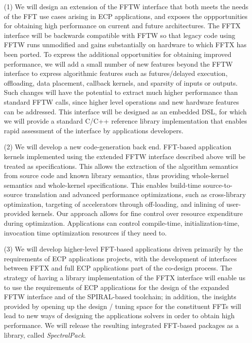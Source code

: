 \begin{trivlist}
\item
(1) We will design an extension of the FFTW interface that both meets the needs of the FFT use cases arising in ECP applications, and exposes the
oppportunities for obtaining high performance on current and future 
architectures. The FFTX interface will be 
backwards compatible with FFTW so that legacy code using FFTW runs unmodified and gains substantially on hardware to which FFTX has been ported.
To express the additional opportunities for obtaining improved performance, we will add a small number of new features beyond the FFTW interface to express algorithmic features such as futures/delayed execution,
offloading, data placement, callback kernels, and sparsity of inputs or outputs. Such changes will have the potential to extract
much higher performance than standard FFTW calls, since higher level operations and new hardware features can be addressed. This interface will be designed as an embedded DSL, for which we will provide a standard C/C++ reference library implementation that enables rapid assessment of the interface by applications developers.
\item
(2) We will develop a new code-generation back end. FFT-based application kernels implemented using the extended FFTW interface described above will be treated as specifications. This allows the extraction of the algorithm semantics from source code and known library semantics, thus providing whole-kernel semantics and whole-kernel specifications. This enables build-time source-to-source translation and advanced performance optimizations, such as
cross-library optimization, targeting of accelerators through off-loading, and inlining of user-provided kernels.
Our approach allows for fine control over resource expenditure during optimization. Applications can control compile-time, initialization-time, invocation time optimization resources if they need to.
\item
(3) We will develop higher-level FFT-based applications driven primarily by the requirements of ECP applications projects, with the development of interfaces between FFTX and full ECP applications part of the co-design process. The strategy of having a library implementation of the FFTX interface will enable us to use the requirements of ECP applications for the design of the expanded FFTW interface and of the SPIRAL-based toolchain; in addition, the insights provided by opening up the design / tuning space for the constituent FFTs will lead to new ways of designing the applications solvers in order to obtain high performance. We will release the resulting integrated FFT-based packages as a library, called {\em SpectralPack}.

\end{trivlist}

